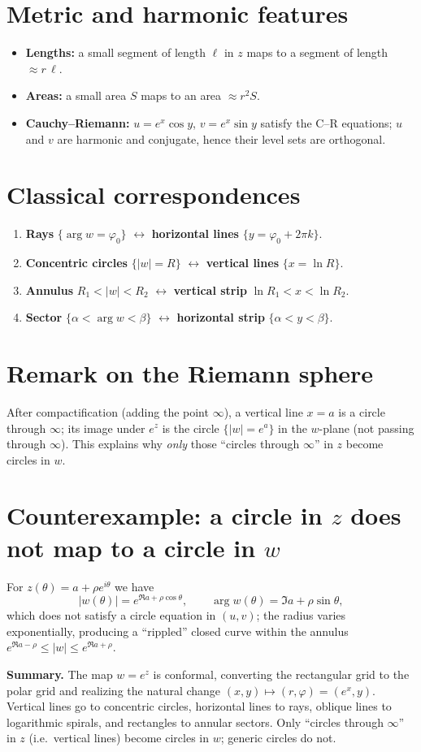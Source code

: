 \documentclass[11pt]{article}
\begin{document}
\section*{Metric and harmonic features}
\begin{itemize}
	\item \textbf{Lengths:} a small segment of length $\ell$ in $z$ maps to a segment of length $\approx r\,\ell$.
	\item \textbf{Areas:} a small area $S$ maps to an area $\approx r^{2}S$.
	\item \textbf{Cauchy--Riemann:} $u=e^{x}\cos y$, $v=e^{x}\sin y$ satisfy the C--R equations; $u$ and $v$ are harmonic and conjugate, hence their level sets are orthogonal.
\end{itemize}

\section*{Classical correspondences}
\begin{enumerate}
	\item \textbf{Rays} $\{\arg w=\varphi_{0}\}$ $\leftrightarrow$ \textbf{horizontal lines} $\{y=\varphi_{0}+2\pi k\}$.
	\item \textbf{Concentric circles} $\{|w|=R\}$ $\leftrightarrow$ \textbf{vertical lines} $\{x=\ln R\}$.
	\item \textbf{Annulus} $R_{1}<|w|<R_{2}$ $\leftrightarrow$ \textbf{vertical strip} $\ln R_{1}<x<\ln R_{2}$.
	\item \textbf{Sector} $\{\alpha<\arg w<\beta\}$ $\leftrightarrow$ \textbf{horizontal strip} $\{\alpha<y<\beta\}$.
\end{enumerate}

\section*{Remark on the Riemann sphere}
After compactification (adding the point $\infty$), a vertical line $x=a$ is a circle through $\infty$; its image under $e^{z}$ is the circle $\{|w|=e^{a}\}$ in the $w$-plane (not passing through $\infty$). This explains why \emph{only} those “circles through $\infty$” in $z$ become circles in $w$.

\section*{Counterexample: a circle in $z$ does not map to a circle in $w$}
For $z(\theta)=a+\rho e^{i\theta}$ we have
\[
|w(\theta)|=e^{\Re a+\rho\cos\theta},\qquad
\arg w(\theta)=\Im a+\rho\sin\theta,
\]
which does not satisfy a circle equation in $(u,v)$; the radius varies exponentially, producing a “rippled” closed curve within the annulus $e^{\Re a-\rho}\le |w|\le e^{\Re a+\rho}$.

\bigskip

\noindent\textbf{Summary.} The map $w=e^{z}$ is conformal, converting the rectangular grid to the polar grid and realizing the natural change $(x,y)\mapsto(r,\varphi)=(e^{x},y)$. Vertical lines go to concentric circles, horizontal lines to rays, oblique lines to logarithmic spirals, and rectangles to annular sectors. Only “circles through $\infty$” in $z$ (i.e.\ vertical lines) become circles in $w$; generic circles do not.
\end{document}
